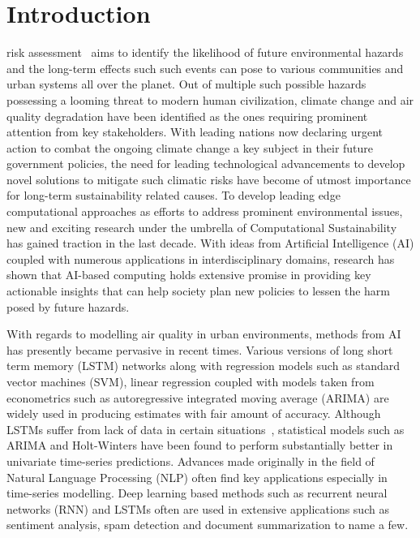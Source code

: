 \documentclass[10pt,journal]{IEEEtran}
\begin{document}
\maketitle

\IEEEdisplaynontitleabstractindextext
\IEEEpeerreviewmaketitle


\ifCLASSOPTIONcompsoc
{}
\else
\section{Introduction}
\label{sec:introduction}
\fi

 risk assessment~\cite{Jones.2001} aims to identify the likelihood of future environmental hazards and the long-term effects such such events can pose to various communities and urban systems all over the planet. Out of multiple such possible hazards possessing a looming threat to modern human civilization, climate change and air quality degradation have been identified as the ones requiring prominent attention from key stakeholders. With leading nations now declaring urgent action to combat the ongoing climate change a key subject in their future government policies\cite{UN.2015}, the need for leading technological advancements to develop novel solutions to mitigate such climatic risks have become of utmost importance for long-term sustainability related causes.  To develop leading edge computational approaches as efforts to address prominent environmental issues, new and exciting research under the umbrella of Computational Sustainability~\cite{Gomes.2019} has gained traction in the last decade. With ideas from Artificial Intelligence (AI) coupled with numerous applications in interdisciplinary domains, research has shown that AI-based computing holds extensive promise in providing key actionable insights that can help society plan new policies to lessen the harm posed by future hazards.

With regards to modelling air quality in urban environments, methods from AI has presently became pervasive in recent times. Various versions of long short term memory (LSTM) networks along with regression models such as standard vector machines (SVM), linear regression coupled with models taken from econometrics such as autoregressive integrated moving average (ARIMA) are widely used in producing estimates with fair amount of accuracy. Although LSTMs suffer from lack of data in certain situations~\cite{Nath.2021}, statistical models such as ARIMA and Holt-Winters have been found to perform substantially better in univariate time-series predictions. Advances made originally in the field of Natural Language Processing (NLP) often find key applications especially in time-series modelling. Deep learning based methods such as recurrent neural networks (RNN) and LSTMs often are used in extensive applications such as sentiment analysis, spam detection and document summarization to name a few.
\end{document}
